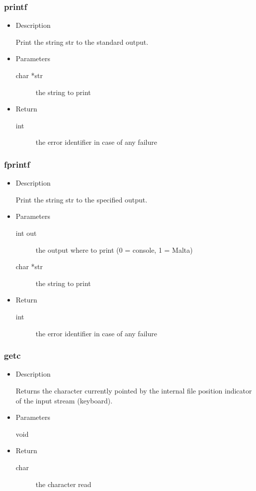 \subsubsection{printf}
\begin{itemize}
  \item{Description}

	 Print the string str to the standard output.
  \item{Parameters}
	 \begin{description}
		\item[char *str] the string to print
	 \end{description}
  \item{Return}
	 \begin{description}
		\item[int] the error identifier in case of any failure
	 \end{description}
\end{itemize}

\subsubsection{fprintf}
\begin{itemize}
  \item{Description}

	 Print the string str to the specified output.
  \item{Parameters}
	 \begin{description}
		\item[int out] the output where to print (0 = console, 1 = Malta)
		\item[char *str] the string to print
	 \end{description}
  \item{Return}
	 \begin{description}
		\item[int] the error identifier in case of any failure
	 \end{description}
\end{itemize}

\subsubsection{getc}
\begin{itemize}
  \item{Description}

	 Returns the character currently pointed by the internal file position indicator of the input stream (keyboard).
  \item{Parameters}
	 \begin{description}
		\item[void] 
	 \end{description}
  \item{Return}
	 \begin{description}
		\item[char] the character read
	 \end{description}
\end{itemize}

